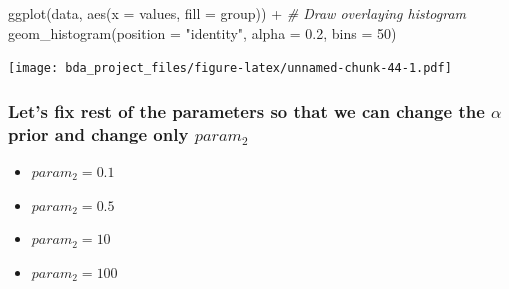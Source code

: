 \documentclass[
]{article}
\newenvironment{Shaded}{\begin{snugshade}}{\end{snugshade}}
\newcommand{\AttributeTok}[1]{\textcolor[rgb]{0.77,0.63,0.00}{#1}}
\newcommand{\CommentTok}[1]{\textcolor[rgb]{0.56,0.35,0.01}{\textit{#1}}}
\newcommand{\DecValTok}[1]{\textcolor[rgb]{0.00,0.00,0.81}{#1}}
\newcommand{\FloatTok}[1]{\textcolor[rgb]{0.00,0.00,0.81}{#1}}
\newcommand{\FunctionTok}[1]{\textcolor[rgb]{0.00,0.00,0.00}{#1}}
\newcommand{\NormalTok}[1]{#1}
\newcommand{\SpecialCharTok}[1]{\textcolor[rgb]{0.00,0.00,0.00}{#1}}
\newcommand{\StringTok}[1]{\textcolor[rgb]{0.31,0.60,0.02}{#1}}
\providecommand{\tightlist}{%
  \setlength{\itemsep}{0pt}\setlength{\parskip}{0pt}}
\begin{document}
\begin{Shaded}
\begin{Highlighting}[]
\FunctionTok{ggplot}\NormalTok{(data, }\FunctionTok{aes}\NormalTok{(}\AttributeTok{x =}\NormalTok{ values, }\AttributeTok{fill =}\NormalTok{ group)) }\SpecialCharTok{+}                       \CommentTok{\# Draw overlaying histogram}
  \FunctionTok{geom\_histogram}\NormalTok{(}\AttributeTok{position =} \StringTok{"identity"}\NormalTok{, }\AttributeTok{alpha =} \FloatTok{0.2}\NormalTok{, }\AttributeTok{bins =} \DecValTok{50}\NormalTok{)}
\end{Highlighting}
\end{Shaded}

\texttt{[image: bda\_project\_files/figure-latex/unnamed-chunk-44-1.pdf]}

\hypertarget{lets-fix-rest-of-the-parameters-so-that-we-can-change-the-alpha-prior-and-change-only-param_2}{%
\subsubsection{\texorpdfstring{Let's fix rest of the parameters so that
we can change the \(\alpha\) prior and change only
\(param_2\)}{Let's fix rest of the parameters so that we can change the \textbackslash alpha prior and change only param\_2}}\label{lets-fix-rest-of-the-parameters-so-that-we-can-change-the-alpha-prior-and-change-only-param_2}}

\begin{itemize}
\tightlist
\item
  \(param_2 = 0.1\)
\item
  \(param_2 = 0.5\)
\item
  \(param_2 = 10\)
\item
  \(param_2 = 100\)
\end{itemize}
\end{document}
